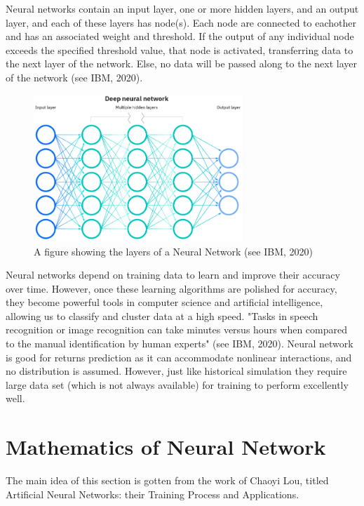\documentclass[a4paper,11pt,oneside]{book}
\begin{document}
Neural networks contain an input layer, one or more hidden layers, and an output layer, and each of these layers has node(s). Each node are connected to eachother and has an associated weight and threshold. If the output of any individual node exceeds the specified threshold value, that node is activated, transferring data to the next layer of the network. Else, no data will be passed along to the next layer of the network (see IBM, 2020).
\begin{figure}[!h]
	\centering
	\includegraphics[width=0.7\textwidth]{figures/NN}
	\caption{A figure showing the layers of a Neural Network (see IBM, 2020)}
	\label{firstfig}
\end{figure}\newline
Neural networks depend on training data to learn and improve their accuracy over time. However, once these learning algorithms are polished for accuracy, they become powerful tools in computer science and artificial intelligence, allowing us to classify and cluster data at a high speed. "Tasks in speech recognition or image recognition can take minutes versus hours when compared to the manual identification by human experts" (see IBM, 2020).
\newline\newline
Neural network is good for returns prediction as it can accommodate nonlinear interactions, and no distribution is assumed. However, just like historical simulation they require large data set (which is not always available) for training to perform excellently well.





\section{Mathematics of Neural Network}
The main idea of this section is gotten from the work of Chaoyi Lou, titled Artificial Neural Networks:
their Training Process and Applications.
\end{document}
